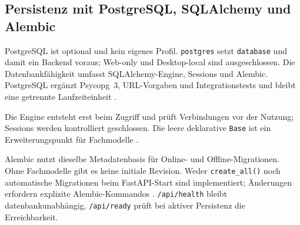 \subsection{Persistenz mit PostgreSQL, SQLAlchemy und Alembic}
\label{subsec:persistenz-postgresql}

PostgreSQL ist optional und kein eigenes Profil. \texttt{postgres} setzt
\texttt{database} und damit ein Backend voraus; Web-only und Desktop-local
sind ausgeschlossen. Die Datenbankfähigkeit umfasst SQLAlchemy-Engine,
Sessions und Alembic. PostgreSQL ergänzt Psycopg~3, URL-Vorgaben und
Integrationstests und bleibt eine getrennte Laufzeiteinheit
\parencite{postgresql2026docs,kleiveist2026database}.

Die Engine entsteht erst beim Zugriff und prüft Verbindungen vor der Nutzung;
Sessions werden kontrolliert geschlossen. Die leere deklarative \texttt{Base}
ist ein Erweiterungspunkt für Fachmodelle
\parencite{sqlalchemy2026engines}.

Alembic nutzt dieselbe Metadatenbasis für Online- und Offline-Migrationen. Ohne
Fachmodelle gibt es keine initiale Revision. Weder \texttt{create\_all()} noch
automatische Migrationen beim FastAPI-Start sind implementiert; Änderungen
erfordern explizite Alembic-Kommandos
\parencite{alembic2026tutorial,kleiveist2026database}. \texttt{/api/health}
bleibt datenbankunabhängig, \texttt{/api/ready} prüft bei aktiver Persistenz die
Erreichbarkeit.
